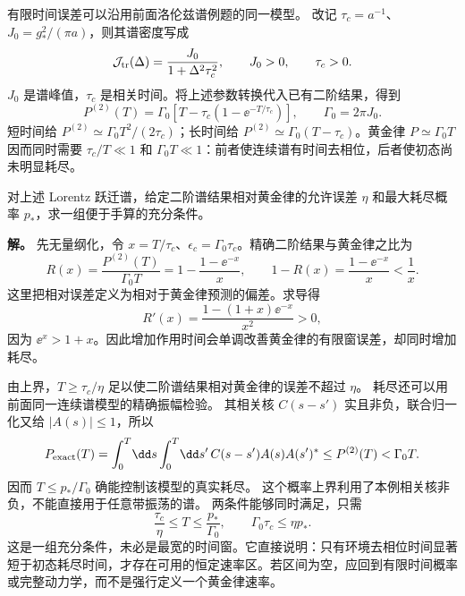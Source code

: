 有限时间误差可以沿用前面洛伦兹谱例题的同一模型。
改记 $\tau_c=a^{-1}$、$J_0=g_*^2/(\pi a)$，则其谱密度写成
\begin{equation*}
 \mathcal J_{\rm tr}(\Delta)=\frac{J_0}{1+\Delta^2\tau_c^2},
 \qquad J_0>0,\qquad \tau_c>0.
\end{equation*}
$J_0$ 是谱峰值，$\tau_c$ 是相关时间。将上述参数转换代入已有二阶结果，得到
\begin{equation}
 P^{(2)}(T)=\Gamma_0[T-\tau_c(1-\ee^{-T/\tau_c})],\qquad
 \Gamma_0=2\pi J_0.
 \label{eq:electron-window-lorentzian-probability}
\end{equation}
短时间给 $P^{(2)}\simeq\Gamma_0T^2/(2\tau_c)$；长时间给 $P^{(2)}\simeq\Gamma_0(T-\tau_c)$。黄金律 $P\simeq\Gamma_0T$ 因而同时需要 $\tau_c/T\ll1$ 和 $\Gamma_0T\ll1$：前者使连续谱有时间去相位，后者使初态尚未明显耗尽。

\begin{exbox}[黄金律的适用时间窗是否存在]
对上述 Lorentz 跃迁谱，给定二阶谱结果相对黄金律的允许误差 $\eta$ 和最大耗尽概率 $p_*$，求一组便于手算的充分条件。

\textbf{解。} 先无量纲化，令 $x=T/\tau_c$、$\epsilon_c=\Gamma_0\tau_c$。精确二阶结果与黄金律之比为
\begin{equation*}
 R(x)=\frac{P^{(2)}(T)}{\Gamma_0T}
 =1-\frac{1-\ee^{-x}}{x},\qquad
 1-R(x)=\frac{1-\ee^{-x}}{x}<\frac1x.
\end{equation*}
这里把相对误差定义为相对于黄金律预测的偏差。求导得
\begin{equation*}
 R'(x)=\frac{1-(1+x)\ee^{-x}}{x^2}>0,
\end{equation*}
因为 $\ee^x>1+x$。因此增加作用时间会单调改善黄金律的有限窗误差，却同时增加耗尽。

由上界，$T\ge\tau_c/\eta$ 足以使二阶谱结果相对黄金律的误差不超过 $\eta$。
耗尽还可以用前面同一连续谱模型的精确振幅检验。
其相关核 $C(s-s')$ 实且非负，联合归一化又给 $|A(s)|\le1$，所以
\[
P_{\rm exact}(T)
=\int_0^T\!\dd s\int_0^T\!\dd s'\,
C(s-s')A(s)A(s')^*
\le P^{(2)}(T)<\Gamma_0T.
\]
因而 $T\le p_*/\Gamma_0$ 确能控制该模型的真实耗尽。
这个概率上界利用了本例相关核非负，不能直接用于任意带振荡的谱。
两条件能够同时满足，只需
\begin{equation*}
 \frac{\tau_c}{\eta}\le T\le\frac{p_*}{\Gamma_0},\qquad
 \Gamma_0\tau_c\le\eta p_*.
\end{equation*}
这是一组充分条件，未必是最宽的时间窗。它直接说明：只有环境去相位时间显著短于初态耗尽时间，才存在可用的恒定速率区。若区间为空，应回到有限时间概率或完整动力学，而不是强行定义一个黄金律速率。
\end{exbox}

